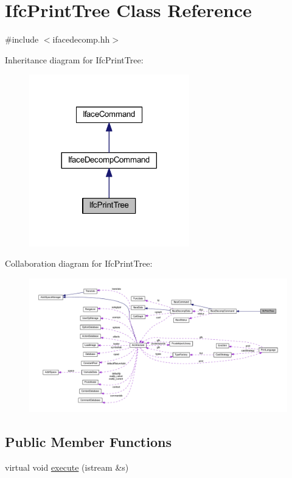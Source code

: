 \hypertarget{class_ifc_print_tree}{}\section{Ifc\+Print\+Tree Class Reference}
\label{class_ifc_print_tree}


{\ttfamily \#include $<$ifacedecomp.\+hh$>$}



Inheritance diagram for Ifc\+Print\+Tree\+:
\nopagebreak
\begin{figure}[H]
\begin{center}
\leavevmode
\includegraphics[width=197pt]{class_ifc_print_tree__inherit__graph}
\end{center}
\end{figure}


Collaboration diagram for Ifc\+Print\+Tree\+:
\nopagebreak
\begin{figure}[H]
\begin{center}
\leavevmode
\includegraphics[width=350pt]{class_ifc_print_tree__coll__graph}
\end{center}
\end{figure}
\subsection*{Public Member Functions}
\begin{DoxyCompactItemize}
\item 
virtual void \mbox{\hyperlink{class_ifc_print_tree_ad0d5950a55f536fbba04efa4ba0ba572}{execute}} (istream \&s)
\end{DoxyCompactItemize}
